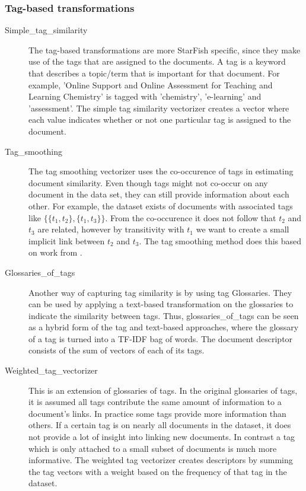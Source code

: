 \subsubsection{Tag-based transformations}
\begin{description}
\item[Simple\_tag\_similarity] The tag-based transformations are more StarFish specific, since they make use of the tags that are assigned to the documents. A tag is a keyword that describes a topic/term that is important for that document. For example, 'Online Support and Online Assessment for Teaching and Learning Chemistry' is tagged with 'chemistry', 'e-learning' and 'assessment'. The simple tag similarity vectorizer creates a vector where each value indicates whether or not one particular tag is assigned to the document. 

\item [Tag\_smoothing] The tag smoothing vectorizer uses the co-occurence of tags in estimating document similarity. Even though tags might not co-occur on any document in the data set, they can still provide information about each other. For example, the dataset exists of documents with associated tags like $\{\{t_1, t_2\}, \{t_1, t_3\}\}$. From the co-occurence it does not follow that $t_2$ and $t_3$ are related, however by transitivity with $t_1$ we want to create a small implicit link between $t_2$ and $t_3$. The tag smoothing method does this based on work from \citet{zhou2011web}.

\item [Glossaries\_of\_tags] Another way of capturing tag similarity is by using tag Glossaries. They can be used by applying a text-based transformation on the glossaries to indicate the similarity between tags. Thus, glossaries\_of\_tags can be seen as a hybrid form of the tag and text-based approaches, where the glossary of a tag is turned into a TF-IDF bag of words. The document descriptor consists of the sum of vectors of each of its tags. 

\item [Weighted\_tag\_vectorizer] This is an extension of glossaries of tags. In the original glossaries of tags, it is assumed all tags contribute the same amount of information to a document's links. In practice some tags provide more information than others. If a certain tag is on nearly all documents in the dataset, it does not provide a lot of insight into linking new documents. In contrast a tag which is only attached to a small subset of documents is much more informative. The weighted tag vectorizer creates descriptors by summing the tag vectors with a weight based on the frequency of that tag in the dataset.
\end{description}

